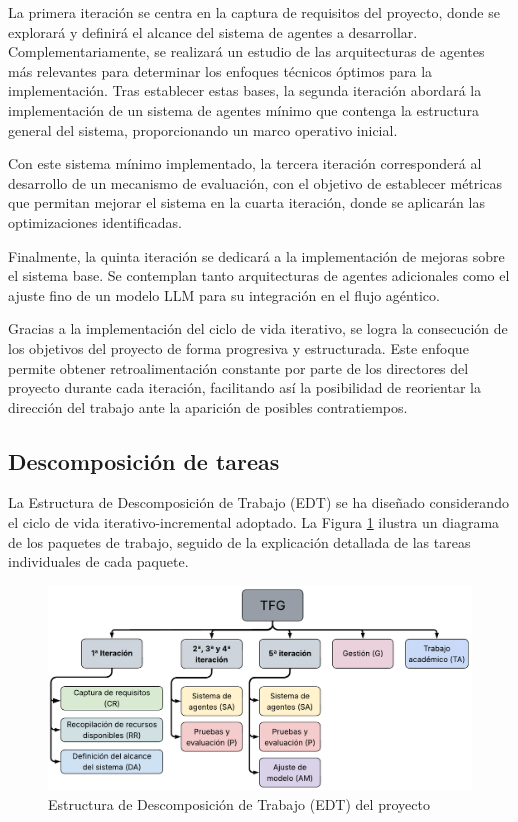 La primera iteración se centra en la captura de requisitos del proyecto, donde se explorará y definirá el alcance del sistema de agentes a desarrollar. Complementariamente, se realizará un estudio de las arquitecturas de agentes más relevantes para determinar los enfoques técnicos óptimos para la implementación. Tras establecer estas bases, la segunda iteración abordará la implementación de un sistema de agentes mínimo que contenga la estructura general del sistema, proporcionando un marco operativo inicial.

Con este sistema mínimo implementado, la tercera iteración corresponderá al desarrollo de un mecanismo de evaluación, con el objetivo de establecer métricas que permitan mejorar el sistema en la cuarta iteración, donde se aplicarán las optimizaciones identificadas. 

Finalmente, la quinta iteración se dedicará a la implementación de mejoras sobre el sistema base. Se contemplan tanto arquitecturas de agentes adicionales como el ajuste fino de un modelo LLM para su integración en el flujo agéntico. 

Gracias a la implementación del ciclo de vida iterativo, se logra la consecución de los objetivos del proyecto de forma progresiva y estructurada. Este enfoque permite obtener retroalimentación constante por parte de los directores del proyecto durante cada iteración, facilitando así la posibilidad de reorientar la dirección del trabajo ante la aparición de posibles contratiempos.

\subsection{Descomposición de tareas}
La Estructura de Descomposición de Trabajo (EDT) se ha diseñado considerando el ciclo de vida iterativo-incremental adoptado. La Figura \ref{fig:edt} ilustra un diagrama de los paquetes de trabajo, seguido de la explicación detallada de las tareas individuales de cada paquete.

\begin{figure}[hbtp]
  \centering
  \includegraphics[scale=0.6]{figures/edt_mod.pdf}
  \caption{Estructura de Descomposición de Trabajo (EDT) del proyecto}
  \label{fig:edt}
\end{figure}

